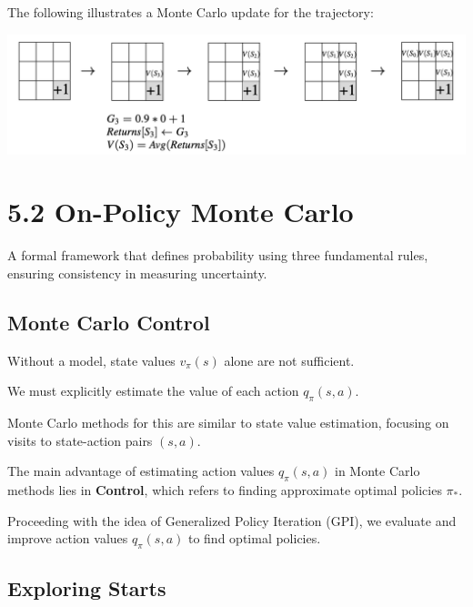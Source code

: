 \documentclass[
  letterpaper,
  DIV=11,
  numbers=noendperiod]{scrreprt}
\begin{document}
The following illustrates a Monte Carlo update for the trajectory:

\begin{center}
\includegraphics[width=0.65\linewidth,height=\textheight,keepaspectratio]{lecture5/images/MonteCarloUpdate.png}
\end{center}

\chapter{5.2 On-Policy Monte Carlo}\label{on-policy-monte-carlo}

\begin{tcolorbox}[enhanced jigsaw, arc=.35mm, toprule=.15mm, leftrule=.75mm, colback=white, left=2mm, colframe=quarto-callout-note-color-frame, rightrule=.15mm, opacityback=0, breakable, bottomrule=.15mm]

A formal framework that defines probability using three fundamental
rules, ensuring consistency in measuring uncertainty. 🎲

\end{tcolorbox}

\section{Monte Carlo Control}\label{monte-carlo-control}

Without a model, state values \(v_{\pi}(s)\) alone are not sufficient.

We must explicitly estimate the value of each action \(q_{\pi}(s,a)\).

Monte Carlo methods for this are similar to state value estimation,
focusing on visits to state-action pairs \((s,a)\).

The main advantage of estimating action values \(q_{\pi}(s,a)\) in Monte
Carlo methods lies in \textbf{Control}, which refers to finding
approximate optimal policies \(\pi_{*}\).

Proceeding with the idea of Generalized Policy Iteration (GPI), we
evaluate and improve action values \(q_{\pi}(s,a)\) to find optimal
policies.

\section{Exploring Starts}\label{exploring-starts}
\end{document}
